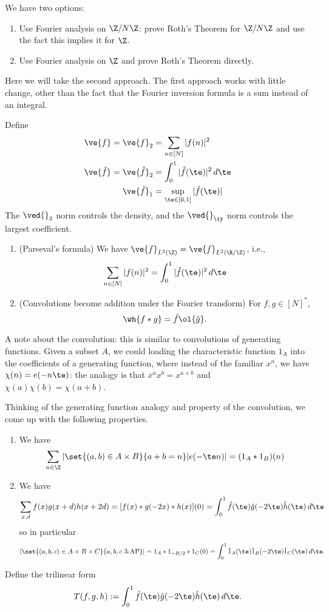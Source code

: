 We have two options:
\begin{enumerate}
\item
Use Fourier analysis on $\Z/N\Z$: prove Roth's Theorem for $\Z/N\Z$ and use the fact this implies it for $\Z$.
\item
Use Fourier analysis on $\Z$ and prove Roth's Theorem directly.
\end{enumerate}

Here we will take the second approach. The first approach works with little change, other than the fact that the Fourier inversion formula is a sum instead of an integral.

Define 
\begin{align*}
\ve{f}=\ve{f}_{2}&=\sum_{n\in [N]}|f(n)|^2\\
\ve{\hat f}=\ve{\hat f}_2&=\int_0^1|\hat f(\te)|^2\,d\te\\
\ve{\hat f}_1&=\sup_{\te\in [0,1]}|\hat f(\te)|
\end{align*}
The $\ved{}_2$ norm controls the density, and the $\ved{}_{\iy}$ norm controls the largest coefficient.
\begin{pr}
\begin{enumerate}
\item
(Parseval's formula) We have $\ve{f}_{L^2(\Z)}=\ve{f}_{L^2(\R/\Z)}$, i.e., 
\[
\sum_{n\in [N]} |f(n)|^2=\int_{0}^1 |\hat f(\te)|^2\,d\te
\]
\item (Convolutions become addition under the Fourier transform)
For $f,g\in [N]^*$,
\[
\wh{f*g}=\hat{f}\ol{\hat{g}}.
\]
\end{enumerate}
\end{pr}
A note about the convolution: this is similar to convolutions of generating functions. Given a subset $A$, we could loading the characteristic function $1_A$ into the coefficients of a generating function, where instead of the familiar $x^n$, we have $\chi(n)=e(-n\te)$: the analogy is that $x^ax^b=x^{a+b}$ and $\chi(a)\chi(b)=\chi(a+b)$.

Thinking of the generating function analogy and property of the convolution, we come up with the following properties.
\begin{pr}
\begin{enumerate}
\item 
We have
\[
\sum_{n\in \Z}
|\set{(a,b)\in A\times B}{a+b=n}|e(-\te n)|
=
(1_{A}*1_B)(n)
\]
\item 
We have
\[
\sum_{x,d}f(x)g(x+d)h(x+2d)
=
[f(x)*g(-2x)*h(x)](0)=\int_0^1 \hat f(\te)\hat g(-2\te)\hat h(\te)\,d\te
\]
so in particular
\[
|\set{(a,b,c)\in A\times B\times C}{a,b,c\text{ 3-AP}}|
=
1_A*1_{-B/2}*1_C(0)=\int_0^1 \hat1_A(\te)\hat 1_{B}(-2\te)\hat 1_C(\te)\,d\te.
\]
\end{enumerate}
\end{pr}
\begin{df}
Define the trilinear form
\[
T(f,g,h):=\int_0^1 \hat f(\te)\hat g(-2\te)\hat h(\te)\,d\te.
\]
\end{df}



